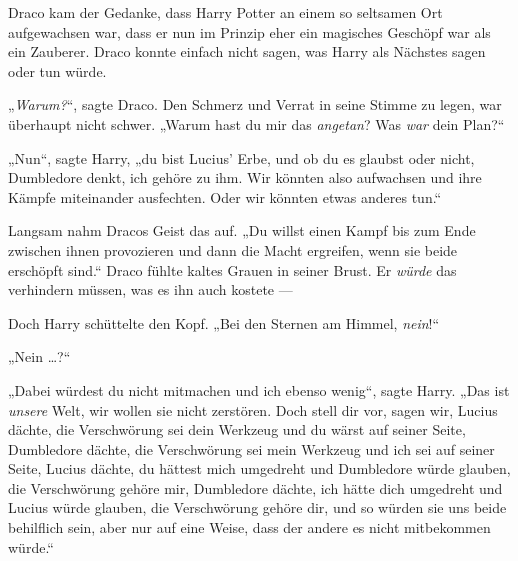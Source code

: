 Draco kam der Gedanke, dass Harry Potter an einem so seltsamen Ort aufgewachsen war, dass er nun im Prinzip eher ein magisches Geschöpf war als ein Zauberer. Draco konnte einfach nicht sagen, was Harry als Nächstes sagen oder tun würde.

„\emph{Warum?}“, sagte Draco. Den Schmerz und Verrat in seine Stimme zu legen, war überhaupt nicht schwer.
„Warum hast du mir das \emph{angetan}? Was \emph{war} dein Plan?“

„Nun“, sagte Harry, „du bist Lucius’ Erbe, und ob du es glaubst oder nicht, Dumbledore denkt, ich gehöre zu ihm. Wir könnten also aufwachsen und ihre Kämpfe miteinander ausfechten. Oder wir könnten etwas anderes tun.“

Langsam nahm Dracos Geist das auf.
„Du willst einen Kampf bis zum Ende zwischen ihnen provozieren und dann die Macht ergreifen, wenn sie beide erschöpft sind.“ Draco fühlte kaltes Grauen in seiner Brust. Er \emph{würde} das verhindern müssen, was es ihn auch kostete —

Doch Harry schüttelte den Kopf.
„Bei den Sternen am Himmel, \emph{nein}!“

„Nein …?“

„Dabei würdest du nicht mitmachen und ich ebenso wenig“, sagte Harry.
„Das ist \emph{unsere} Welt, wir wollen sie nicht zerstören. Doch stell dir vor, sagen wir, Lucius dächte, die Verschwörung sei dein Werkzeug und du wärst auf seiner Seite, Dumbledore dächte, die Verschwörung sei mein Werkzeug und ich sei auf seiner Seite, Lucius dächte, du hättest mich umgedreht und Dumbledore würde glauben, die Verschwörung gehöre mir, Dumbledore dächte, ich hätte dich umgedreht und Lucius würde glauben, die Verschwörung gehöre dir, und so würden sie uns beide behilflich sein, aber nur auf eine Weise, dass der andere es nicht mitbekommen würde.“


